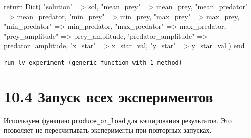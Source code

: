 \documentclass[
  12pt,
  a4paper,
  DIV=11,
  numbers=noendperiod]{scrreprt}
\newenvironment{Shaded}{\begin{snugshade}}{\end{snugshade}}
\newcommand{\ControlFlowTok}[1]{\textcolor[rgb]{0.00,0.23,0.31}{#1}}
\newcommand{\FunctionTok}[1]{\textcolor[rgb]{0.28,0.35,0.67}{#1}}
\newcommand{\KeywordTok}[1]{\textcolor[rgb]{0.00,0.23,0.31}{#1}}
\newcommand{\NormalTok}[1]{\textcolor[rgb]{0.00,0.23,0.31}{#1}}
\newcommand{\OperatorTok}[1]{\textcolor[rgb]{0.37,0.37,0.37}{#1}}
\newcommand{\StringTok}[1]{\textcolor[rgb]{0.13,0.47,0.30}{#1}}
\begin{document}
\begin{Shaded}
\begin{Highlighting}[]
    \ControlFlowTok{return} \FunctionTok{Dict}\NormalTok{(}
        \StringTok{"solution"} \OperatorTok{=\textgreater{}}\NormalTok{ sol,}
        \StringTok{"mean\_prey"} \OperatorTok{=\textgreater{}}\NormalTok{ mean\_prey,}
        \StringTok{"mean\_predator"} \OperatorTok{=\textgreater{}}\NormalTok{ mean\_predator,}
        \StringTok{"min\_prey"} \OperatorTok{=\textgreater{}}\NormalTok{ min\_prey,}
        \StringTok{"max\_prey"} \OperatorTok{=\textgreater{}}\NormalTok{ max\_prey,}
        \StringTok{"min\_predator"} \OperatorTok{=\textgreater{}}\NormalTok{ min\_predator,}
        \StringTok{"max\_predator"} \OperatorTok{=\textgreater{}}\NormalTok{ max\_predator,}
        \StringTok{"prey\_amplitude"} \OperatorTok{=\textgreater{}}\NormalTok{ prey\_amplitude,}
        \StringTok{"predator\_amplitude"} \OperatorTok{=\textgreater{}}\NormalTok{ predator\_amplitude,}
        \StringTok{"x\_star"} \OperatorTok{=\textgreater{}}\NormalTok{ x\_star\_val,}
        \StringTok{"y\_star"} \OperatorTok{=\textgreater{}}\NormalTok{ y\_star\_val}
\NormalTok{    )}
\KeywordTok{end}
\end{Highlighting}
\end{Shaded}

\begin{verbatim}
run_lv_experiment (generic function with 1 method)
\end{verbatim}

\section{10.4 Запуск всех
экспериментов}\label{ux437ux430ux43fux443ux441ux43a-ux432ux441ux435ux445-ux44dux43aux441ux43fux435ux440ux438ux43cux435ux43dux442ux43eux432}

Используем функцию \texttt{produce\_or\_load} для кэширования
результатов. Это позволяет не пересчитывать эксперименты при повторных
запусках.
\end{document}
